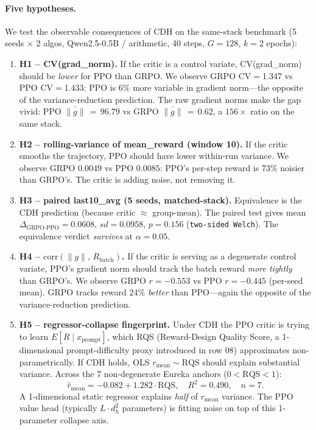 \documentclass{article}
\begin{document}
\paragraph{Five hypotheses.}
We test the observable consequences of CDH on the same-stack
benchmark (5 seeds $\times$ 2 algos, Qwen2.5-0.5B / arithmetic, 40
steps, $G{=}128$, $k{=}2$ epochs):
\begin{enumerate}\itemsep2pt
\item \textbf{H1 -- CV(grad\_norm).} If the critic is a control
  variate, CV(grad\_norm) should be \emph{lower} for PPO than GRPO.
  We observe GRPO CV$=$1.347 vs PPO CV$=$1.433: PPO is $6\%$ more
  variable in gradient norm---the opposite of the variance-reduction
  prediction. The raw gradient norms make the gap vivid: PPO
  $\bar{\|g\|}\,{=}\,96.79$ vs GRPO $\bar{\|g\|}\,{=}\,0.62$, a
  $156\times$ ratio on the same stack.
\item \textbf{H2 -- rolling-variance of mean\_reward (window 10).}
  If the critic smooths the trajectory, PPO should have lower
  within-run variance. We observe GRPO $0.0049$ vs PPO $0.0085$:
  PPO's per-step reward is $73\%$ noisier than GRPO's. The critic is
  adding noise, not removing it.
\item \textbf{H3 -- paired last10\_avg (5 seeds, matched-stack).}
  Equivalence is the CDH prediction (because critic $\approx$ group-mean).
  The paired test gives mean $\Delta_{\text{GRPO-PPO}}=0.0608$,
  $sd{=}0.0958$, $p{=}0.156$ (\texttt{two-sided Welch}). The
  equivalence verdict \emph{survives} at $\alpha{=}0.05$.
\item \textbf{H4 -- $\mathrm{corr}(\|g\|,\,R_\text{batch})$.} If the
  critic is serving as a degenerate control variate, PPO's gradient
  norm should track the batch reward \emph{more tightly} than GRPO's.
  We observe GRPO $r{=}{-}0.553$ vs PPO $r{=}{-}0.445$ (per-seed mean).
  GRPO tracks reward $24\%$ \emph{better} than PPO---again the
  opposite of the variance-reduction prediction.
\item \textbf{H5 -- regressor-collapse fingerprint.} Under CDH the
  PPO critic is trying to learn $E[R \mid x_\text{prompt}]$, which
  RQS (Reward-Design Quality Score, a 1-dimensional prompt-difficulty
  proxy introduced in row 08) approximates non-parametrically. If
  CDH holds, OLS $r_\text{mean} \sim \mathrm{RQS}$ should explain
  substantial variance. Across the 7 non-degenerate Eureka anchors
  ($0 < \mathrm{RQS} < 1$):
  \begin{equation*}
    \hat r_\text{mean} = -0.082 + 1.282 \cdot \mathrm{RQS},\quad
    R^2 = 0.490,\quad n = 7.
  \end{equation*}
  A 1-dimensional static regressor explains \emph{half} of
  $r_\text{mean}$ variance. The PPO value head (typically
  $L \cdot d_h^2$ parameters) is fitting noise on top of this
  1-parameter collapse axis.
\end{enumerate}
\end{document}
